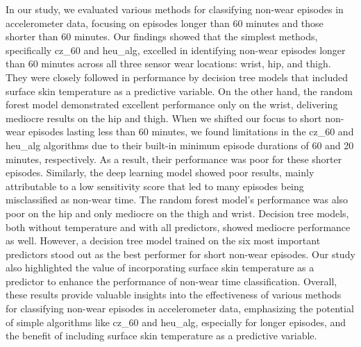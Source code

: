 \documentclass[
  9pt,
]{scrbook}
\begin{document}
In our study, we evaluated various methods for classifying non-wear
episodes in accelerometer data, focusing on episodes longer than 60
minutes and those shorter than 60 minutes. Our findings showed that the
simplest methods, specifically cz\_60 and heu\_alg, excelled in
identifying non-wear episodes longer than 60 minutes across all three
sensor wear locations: wrist, hip, and thigh. They were closely followed
in performance by decision tree models that included surface skin
temperature as a predictive variable. On the other hand, the random
forest model demonstrated excellent performance only on the wrist,
delivering mediocre results on the hip and thigh. When we shifted our
focus to short non-wear episodes lasting less than 60 minutes, we found
limitations in the cz\_60 and heu\_alg algorithms due to their built-in
minimum episode durations of 60 and 20 minutes, respectively. As a
result, their performance was poor for these shorter episodes.
Similarly, the deep learning model showed poor results, mainly
attributable to a low sensitivity score that led to many episodes being
misclassified as non-wear time. The random forest model's performance
was also poor on the hip and only mediocre on the thigh and wrist.
Decision tree models, both without temperature and with all predictors,
showed mediocre performance as well. However, a decision tree model
trained on the six most important predictors stood out as the best
performer for short non-wear episodes. Our study also highlighted the
value of incorporating surface skin temperature as a predictor to
enhance the performance of non-wear time classification. Overall, these
results provide valuable insights into the effectiveness of various
methods for classifying non-wear episodes in accelerometer data,
emphasizing the potential of simple algorithms like cz\_60 and heu\_alg,
especially for longer episodes, and the benefit of including surface
skin temperature as a predictive variable.
\end{document}
